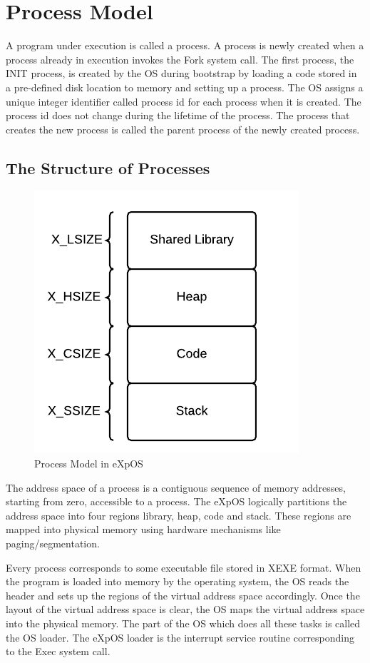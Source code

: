 \chapter{Process Model}
\label{chap4}
A program under execution is called a process. A process is newly created when a process already in execution invokes the Fork system call. The first process, the INIT process, is created by the OS during bootstrap by loading a code stored in a pre-defined disk location to memory and setting up a process. The OS assigns a unique integer identifier called process id for each process when it is created. The process id does not change during the lifetime of the process. The process that creates the new process is called the parent process of the newly created process.
\section{The Structure of Processes}

\FloatBarrier
\begin{figure}[ht]
\centering
\includegraphics{figures/process_model.png}
\caption{\footnotesize Process Model in eXpOS}
\end{figure}
\FloatBarrier

The address space of a process is a contiguous sequence of memory addresses, starting from zero, accessible to a process. The eXpOS logically partitions the address space into four regions library, heap, code and stack. These regions are mapped into physical memory using hardware mechanisms like paging/segmentation.


Every process corresponds to some executable file stored in XEXE format. When the program is loaded into memory by the operating system, the OS reads the header and sets up the regions of the virtual address space accordingly. Once the layout of the virtual address space is clear, the OS maps the virtual address space into the physical memory. The part of the OS which does all these tasks is called the OS loader. The eXpOS loader is the interrupt service routine corresponding to the Exec system call.


